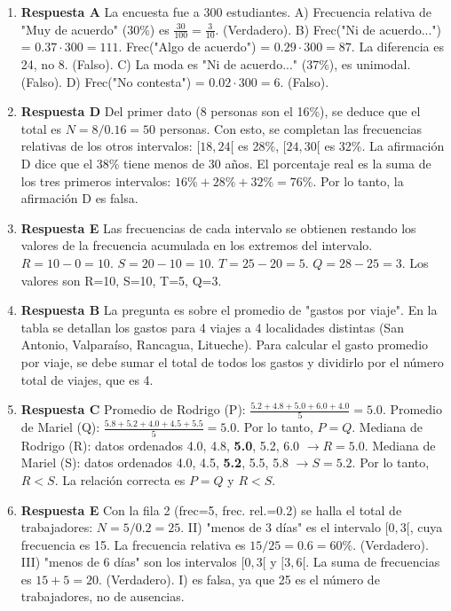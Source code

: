 \documentclass[11pt]{article}
\begin{document}
\begin{enumerate}
    \item \textbf{Respuesta A} La encuesta fue a 300 estudiantes. A) Frecuencia relativa de "Muy de acuerdo" (30\%) es $\frac{30}{100} = \frac{3}{10}$. (Verdadero). B) Frec("Ni de acuerdo...") = $0.37 \cdot 300 = 111$. Frec("Algo de acuerdo") = $0.29 \cdot 300 = 87$. La diferencia es 24, no 8. (Falso). C) La moda es "Ni de acuerdo..." (37\%), es unimodal. (Falso). D) Frec("No contesta") = $0.02 \cdot 300 = 6$. (Falso). %
    
    \item \textbf{Respuesta D} Del primer dato (8 personas son el 16\%), se deduce que el total es $N = 8/0.16 = 50$ personas. Con esto, se completan las frecuencias relativas de los otros intervalos: $[18,24[$ es 28\%, $[24,30[$ es 32\%. La afirmación D dice que el 38\% tiene menos de 30 años. El porcentaje real es la suma de los tres primeros intervalos: $16\%+28\%+32\%=76\%$. Por lo tanto, la afirmación D es falsa. %
    
    \item \textbf{Respuesta E} Las frecuencias de cada intervalo se obtienen restando los valores de la frecuencia acumulada en los extremos del intervalo. $R = 10-0 = 10$. $S = 20-10 = 10$. $T = 25-20 = 5$. $Q = 28-25 = 3$. Los valores son R=10, S=10, T=5, Q=3. %

    \item \textbf{Respuesta B} La pregunta es sobre el promedio de "gastos por viaje". En la tabla se detallan los gastos para 4 viajes a 4 localidades distintas (San Antonio, Valparaíso, Rancagua, Litueche). Para calcular el gasto promedio por viaje, se debe sumar el total de todos los gastos y dividirlo por el número total de viajes, que es 4. %

    \item \textbf{Respuesta C} Promedio de Rodrigo (P): $\frac{5.2+4.8+5.0+6.0+4.0}{5} = 5.0$. Promedio de Mariel (Q): $\frac{5.8+5.2+4.0+4.5+5.5}{5} = 5.0$. Por lo tanto, $P=Q$. Mediana de Rodrigo (R): datos ordenados 4.0, 4.8, \textbf{5.0}, 5.2, 6.0 $\rightarrow R=5.0$. Mediana de Mariel (S): datos ordenados 4.0, 4.5, \textbf{5.2}, 5.5, 5.8 $\rightarrow S=5.2$. Por lo tanto, $R<S$. La relación correcta es $P=Q$ y $R<S$. %
    
    \item \textbf{Respuesta E} Con la fila 2 (frec=5, frec. rel.=0.2) se halla el total de trabajadores: $N=5/0.2 = 25$. II) "menos de 3 días" es el intervalo $[0, 3[$, cuya frecuencia es 15. La frecuencia relativa es $15/25=0.6=60\%$. (Verdadero). III) "menos de 6 días" son los intervalos $[0, 3[$ y $[3, 6[$. La suma de frecuencias es $15+5=20$. (Verdadero). I) es falsa, ya que 25 es el número de trabajadores, no de ausencias. %
    

\end{enumerate}
\end{document}
